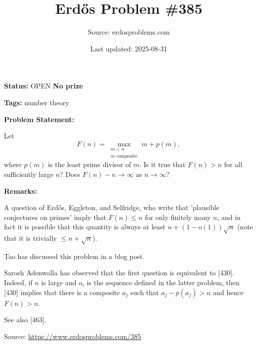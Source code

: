\documentclass{article}
\title{Erd\H{o}s Problem \#385}
\date{Last updated: 2025-08-31}
\author{Source: erdosproblems.com}
\begin{document}
\maketitle

\noindent\textbf{Status:} OPEN \quad \textbf{No prize}

\noindent\textbf{Tags:} number theory

\medskip
\noindent\textbf{Problem Statement:}

Let\[F(n) = \max_{\substack{m<n\\ m\textrm{ composite}}} m+p(m),\]where $p(m)$ is the least prime divisor of $m$. Is it true that $F(n)>n$ for all sufficiently large $n$? Does $F(n)-n\to \infty$ as $n\to\infty$?

\bigskip
\noindent\textbf{Remarks:}

A question of Erd\H{o}s, Eggleton, and Selfridge, who write that 'plausible conjectures on primes' imply that $F(n)\leq n$ for only finitely many $n$, and in fact it is possible that this quantity is always at least $n+(1-o(1))\sqrt{n}$ (note that it is trivially $\leq n+\sqrt{n}$).

Tao has discussed this problem in a blog post.

Sarosh Adenwalla has observed that the first question is equivalent to [430]. Indeed, if $n$ is large and $a_i$ is the sequence defined in the latter problem, then [430] implies that there is a composite $a_j$ such that $a_j-p(a_j)>n$ and hence $F(n)>n$.

See also [463].

\bigskip
\noindent\small{Source: \url{https://www.erdosproblems.com/385}}
\end{document}

